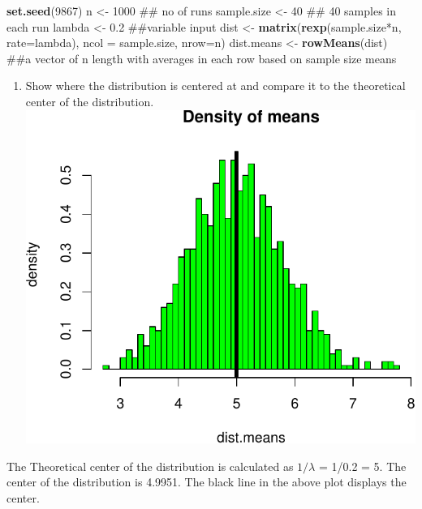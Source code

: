 \documentclass[]{article}
\newenvironment{Shaded}{\begin{snugshade}}{\end{snugshade}}
\newcommand{\KeywordTok}[1]{\textcolor[rgb]{0.13,0.29,0.53}{\textbf{{#1}}}}
\newcommand{\DataTypeTok}[1]{\textcolor[rgb]{0.13,0.29,0.53}{{#1}}}
\newcommand{\DecValTok}[1]{\textcolor[rgb]{0.00,0.00,0.81}{{#1}}}
\newcommand{\FloatTok}[1]{\textcolor[rgb]{0.00,0.00,0.81}{{#1}}}
\newcommand{\StringTok}[1]{\textcolor[rgb]{0.31,0.60,0.02}{{#1}}}
\newcommand{\NormalTok}[1]{{#1}}
\begin{document}
\begin{Shaded}
\begin{Highlighting}[]
\KeywordTok{set.seed}\NormalTok{(}\DecValTok{9867}\NormalTok{)}
\NormalTok{n <-}\StringTok{ }\DecValTok{1000}        \NormalTok{## no of runs}
\NormalTok{sample.size <-}\StringTok{ }\DecValTok{40} \NormalTok{## 40 samples in each run}
\NormalTok{lambda <-}\StringTok{ }\FloatTok{0.2}   \NormalTok{##variable input}
\NormalTok{dist <-}\StringTok{ }\KeywordTok{matrix}\NormalTok{(}\KeywordTok{rexp}\NormalTok{(sample.size*n, }\DataTypeTok{rate=}\NormalTok{lambda), }\DataTypeTok{ncol =} \NormalTok{sample.size, }\DataTypeTok{nrow=}\NormalTok{n)}
\NormalTok{dist.means <-}\StringTok{ }\KeywordTok{rowMeans}\NormalTok{(dist) ##a  vector of n length with averages in each row based on sample size means}
\end{Highlighting}
\end{Shaded}

\begin{enumerate}
\def\labelenumi{\arabic{enumi}.}
\itemsep1pt\parskip0pt
\item
  Show where the distribution is centered at and compare it to the
  theoretical center of the distribution.
  \includegraphics{./Q1_files/figure-latex/Q1.pdf}
\end{enumerate}

The Theoretical center of the distribution is calculated as $1/\lambda$
= 1/0.2 = 5. The center of the distribution is 4.9951. The black line in
the above plot displays the center.
\end{document}
